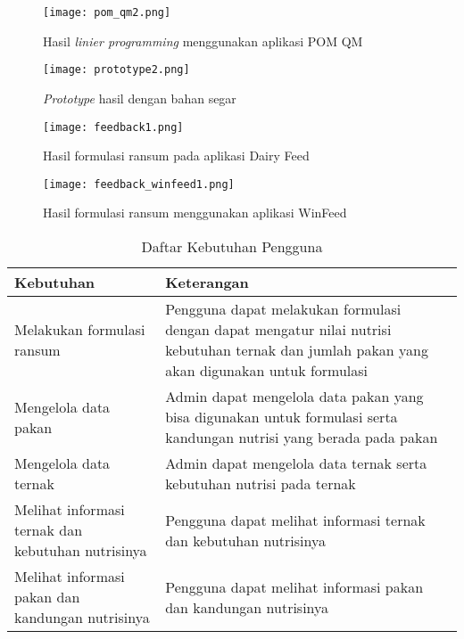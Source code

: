 \begin{figure}[h!] %
	\centering
	\texttt{[image: pom\_qm2.png]}
	\caption{Hasil \textit{linier programming} menggunakan aplikasi POM QM}
	\label{fig:pom_qm2}
\end{figure}

\begin{figure}[h!] %
\centering
\texttt{[image: prototype2.png]}
\caption{\textit{Prototype }hasil dengan bahan segar}
\label{fig:pt2}
\end{figure}

\begin{figure}[h!] %
	\centering
	\texttt{[image: feedback1.png]}
	\caption{Hasil formulasi ransum pada aplikasi Dairy Feed}
	\label{fig:fd1}
\end{figure}

\begin{figure}[h!] %
	\centering
	\texttt{[image: feedback\_winfeed1.png]}
	\caption{Hasil formulasi ransum menggunakan aplikasi WinFeed}
	\label{fig:fd_wf2}
\end{figure}

\begin{table}[h!]
	\centering
	\caption{Daftar Kebutuhan Pengguna}
	\label{my-label}
	\begin{tabular}{ p{2.5cm}p{5cm}  }
		\hline
		Kebutuhan & Keterangan \\ \hline
		Melakukan formulasi ransum & Pengguna dapat melakukan formulasi dengan dapat mengatur nilai nutrisi kebutuhan ternak dan jumlah pakan yang akan digunakan untuk formulasi \\
		Mengelola data pakan & Admin dapat mengelola data pakan yang bisa digunakan untuk formulasi serta kandungan nutrisi yang berada pada pakan \\
		Mengelola data ternak & Admin dapat mengelola data ternak serta kebutuhan nutrisi pada ternak \\
		Melihat informasi ternak dan kebutuhan nutrisinya & Pengguna dapat melihat informasi ternak dan kebutuhan nutrisinya \\
		Melihat informasi pakan dan kandungan nutrisinya & Pengguna dapat melihat informasi pakan dan kandungan nutrisinya \\ \hline
	\end{tabular}
\end{table}

